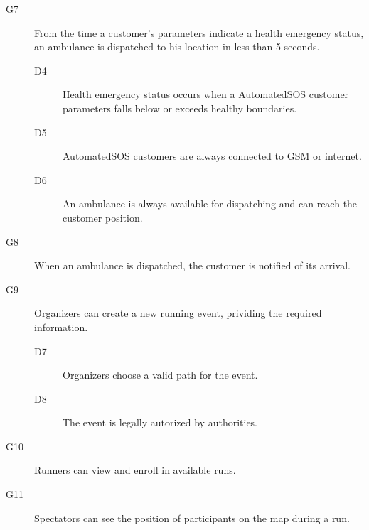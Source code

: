 \documentclass[../main.tex]{subfiles}
\begin{document}
\begin{description}
	\item [G7]  From the time a customer's parameters indicate a health emergency status, an ambulance is dispatched to his location in less than 5 seconds.
	\begin{description}
		\item [D4] Health emergency status occurs when a AutomatedSOS customer parameters falls below or exceeds healthy boundaries.
		\item [D5] AutomatedSOS customers are always connected to GSM or internet.
		\item [D6] An ambulance is always available for dispatching and can reach the customer position.
	\end{description}

	\item [G8]  When an ambulance is dispatched, the customer is notified of its arrival.
	\begin{description}
		\item
	\end{description}

	\item [G9]  Organizers can create a new running event, prividing the required information.
	\begin{description}
		\item [D7] Organizers choose a valid path for the event.
		\item [D8] The event is legally autorized by authorities.
	\end{description}

	\item [G10]  Runners can view and enroll in available runs.
	\begin{description}
		\item []
	\end{description}

	\item [G11] Spectators can see the position of participants on the map during a run.
	\begin{description}
		\item
	\end{description}
\end{description}
\end{document}
